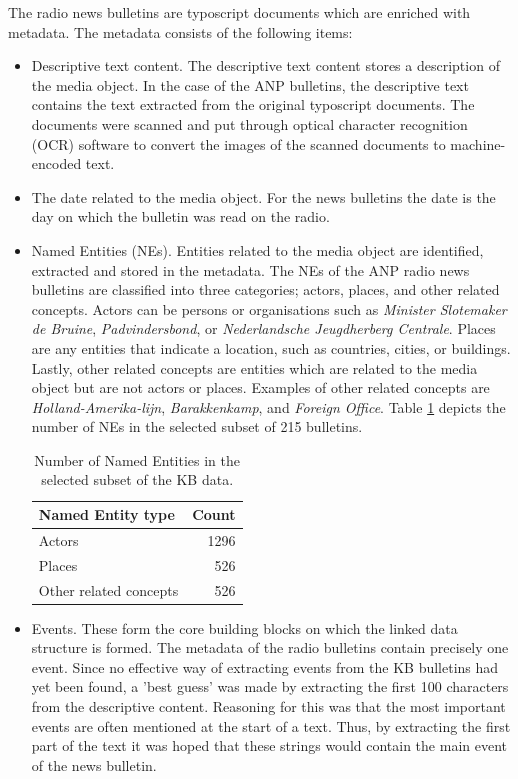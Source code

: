 \documentclass[a4paper, 10pt, conference]{ieeeconf}      %
\begin{document}
The radio news bulletins are typoscript documents which are enriched with metadata. The metadata consists of the following items:
\begin{itemize}
\item Descriptive text content. The descriptive text content stores a description of the media object. In the case of the ANP bulletins, the descriptive text contains the text extracted from the original typoscript documents. The documents were scanned and put through optical character recognition (OCR) software to convert the images of the scanned documents to machine-encoded text. 

\item The date related to the media object. For the news bulletins the date is the day on which the bulletin was read on the radio.

\item Named Entities (NEs). Entities related to the media object are identified, extracted and stored in the metadata. The NEs of the ANP radio news bulletins are classified into three categories; actors, places, and other related concepts. Actors can be persons or organisations such as \textit{Minister Slotemaker de Bruine}, \textit{Padvindersbond}, or \textit{Nederlandsche Jeugdherberg Centrale}. Places are any entities that indicate a location, such as countries, cities, or buildings. Lastly, other related concepts are entities which are related to the media object but are not actors or places. Examples of other related concepts are \textit{Holland-Amerika-lijn}, \textit{Barakkenkamp}, and \textit{Foreign Office}. Table \ref{NE count} depicts the number of NEs in the selected subset of 215 bulletins. 

\begin{table} [b]
  \begin{center}
    \begin{tabular}{l|r}
    Named Entity type & Count\\
    \hline
    Actors & 1296\\
    Places & 526\\
    Other related concepts & 526
    \end{tabular}
  \end{center}
  \caption{Number of Named Entities in the selected subset of the KB data.}
  \label{NE count}
\end{table}

\item Events. These form the core building blocks on which the linked data structure is formed. The metadata of the radio bulletins contain precisely one event. Since no effective way of extracting events from the KB bulletins had yet been found, a 'best guess' was made by extracting the first 100 characters from the descriptive content. Reasoning for this was that the most important events are often mentioned at the start of a text. Thus, by extracting the first part of the text it was hoped that these strings would contain the main event of the news bulletin.
\end{itemize}
\end{document}
